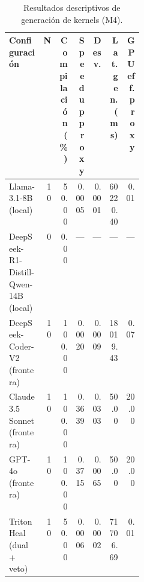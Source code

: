 \begin{table}[ht]
\centering
\caption{Resultados descriptivos de generación de kernels (M4).}
\label{tab:gen_desc}
\footnotesize
\begin{adjustbox}{max width=\linewidth,center}
\begin{tabular}{@{}>{\raggedright\arraybackslash}p{0.26\linewidth}rrrrrr@{}}
\toprule
Configuración & N & Compilación (\%) & Speedup proxy & Desv. & Lat. gen. (ms) & GPU eff. proxy \\
\midrule
Llama-3.1-8B (local) & 10 & 50.00 & 0.0005 & 0.0001 & 60220.40 & 0.01 \\
DeepSeek-R1-Distill-Qwen-14B (local) & 0 & 0.00 & --- & --- & --- & --- \\
DeepSeek-Coder-V2 (frontera) & 10 & 100.00 & 0.0020 & 0.0009 & 18019.43 & 0.07 \\
Claude 3.5 Sonnet (frontera) & 10 & 100.00 & 0.3639 & 0.0303 & 50.00 & 20.00 \\
GPT-4o (frontera) & 10 & 100.00 & 0.3715 & 0.0065 & 50.00 & 20.00 \\
Triton Heal (dual + veto) & 10 & 50.00 & 0.0006 & 0.0002 & 71706.69 & 0.01 \\
\bottomrule
\end{tabular}
\end{adjustbox}
\end{table}
